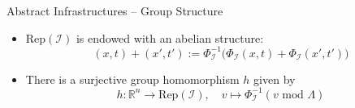 \documentclass{beamer}
\newcommand{\R}{\mathbb{R}}
\newcommand{\cI}{\mathcal{I}}
\newcommand{\Rep}{\mathrm{Rep}}
\renewcommand{\>}{\rangle}
\newcommand{\<}{\langle}
\begin{document}
\begin{frame}{Abstract Infrastructures -- Group Structure}

\begin{itemize}
\item $\Rep(\cI)$ is endowed with an abelian structure:
\[
(x,t) + (x',t') := \Phi_\cI^{-1}\big(\Phi_\cI(x,t) + \Phi_\cI(x',t')\big)
\]

\item There is a surjective group homomorphism $h$ given by
\[
h : \R^n \rightarrow \Rep(\cI), \quad v \mapsto \Phi_\cI^{-1}(v \mbox{ mod } \Lambda)
\]

\end{itemize}

\end{frame}



  
  
  
  
%


%
%
%
%
\end{document}
